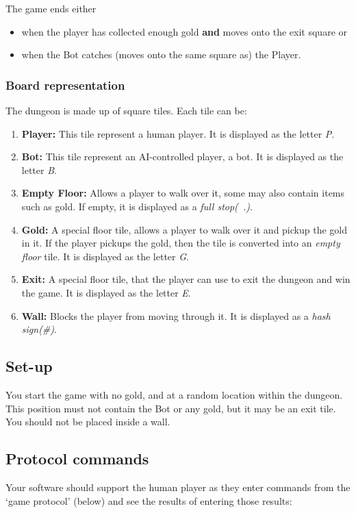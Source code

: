 \documentclass{article}
\begin{document}
The game ends either
\begin{itemize}
\item when the player has collected enough gold \textbf{and} moves onto the exit square or
\item when the Bot catches (moves onto the same square as) the Player.
\end{itemize}

\subsubsection{Board representation}
The dungeon is made up of square tiles. Each tile can be:
\begin{enumerate}
\item{\textbf{Player:}} This tile represent a human player. It is displayed as the letter \textit{P}.

\item{\textbf{Bot:}} This tile represent an AI-controlled player, a bot. It is displayed as the letter \textit{B}.

\item{\textbf{Empty Floor:}} Allows a player to walk over it, some may also contain items such as gold. If empty, it is displayed as a \textit{full stop(\ .)}.

\item{\textbf{Gold:}} A special floor tile, allows a player to walk over it and pickup the gold in it. If the player pickups the gold, then the tile is converted into an \textit{empty floor} tile. It is displayed as the letter \textit{G}.

\item{\textbf{Exit:}} A special floor tile, that the player can use to exit the dungeon and win the game. It is displayed as the letter \textit{E}.

\item{\textbf{Wall:}} Blocks the player from moving through it. It is displayed as a \textit{hash sign(\#)}.
\end{enumerate}

\subsection{Set-up}
You start the game with no gold, and at a random location within the dungeon. This position must not contain the Bot or any gold, but it may be an exit tile. You should not be placed inside a wall. 

\subsection{Protocol commands}
Your software should support the human player as they enter commands from the `game protocol' (below) and see the results of entering those results: 
\end{document}
